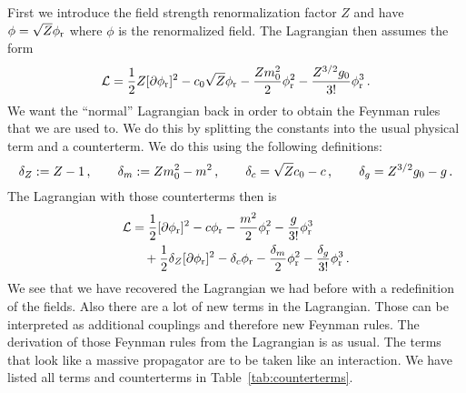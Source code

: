\documentclass[11pt, english, fleqn, DIV=15, headinclude]{scrartcl}
\begin{document}
First we introduce the field strength renormalization factor $Z$ and have $\phi
= \sqrt Z \phi_\text r$ where $\phi$ is the renormalized field. The Lagrangian then
assumes the form
\[
    \mathcal L
    = \frac12 Z [\partial \phi_\text r]^2 - c_0 \sqrt Z \phi_\text r - \frac{Z m_0^2}2\phi_\text r^2
    - \frac{Z^{3/2} g_0}{3!} \phi_\text r^3 \,.
\]
We want the \enquote{normal} Lagrangian back in order to obtain the Feynman
rules that we are used to. We do this by splitting the constants into the usual
physical term and a counterterm. We do this using the following definitions:
\[
    \delta_Z := Z - 1
    \,,\qquad
    \delta_m := Z m_0^2 - m^2
    \,,\qquad
    \delta_c = \sqrt Z c_0 - c
    \,,\qquad
    \delta_g = Z^{3/2} g_0 - g
    \,.
\]
The Lagrangian with those counterterms then is
\[
    \begin{split}
    \mathcal L
    &= \frac12 [\partial \phi_\text r]^2 - c \phi_\text r - \frac{m^2}2\phi_\text r^2
    - \frac{g}{3!} \phi_\text r^3 \\
    &\quad+ \frac12 \delta_Z [\partial \phi_\text r]^2 - \delta_c \phi_\text r - \frac{\delta_m}2\phi_\text r^2
    - \frac{\delta_g}{3!} \phi_\text r^3 \,.
    \end{split}
\]
We see that we have recovered the Lagrangian we had before with a redefinition
of the fields. Also there are a lot of new terms in the Lagrangian. Those can
be interpreted as additional couplings and therefore new Feynman rules. The
derivation of those Feynman rules from the Lagrangian is as usual. The terms
that look like a massive propagator are to be taken like an interaction. We
have listed all terms and counterterms in Table~\ref{tab:counterterms}.
\end{document}
